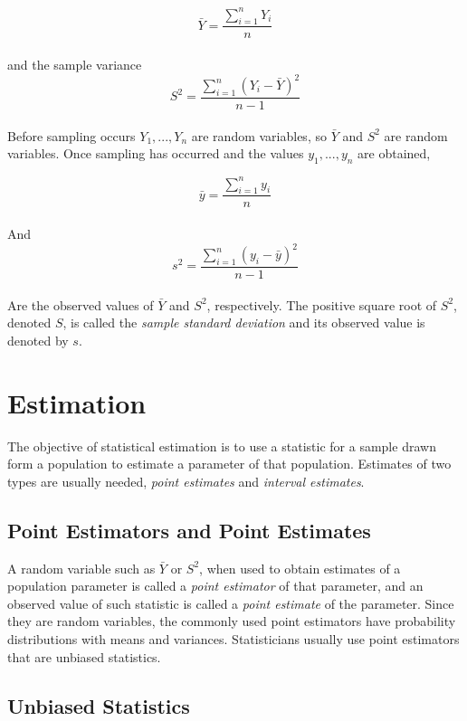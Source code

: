\documentclass{WileySev}
\begin{document}
\begin{equation}
\bar{Y}=\frac{\sum_{i=1}^nY_i}{n}
\end{equation}
\\
and the sample variance
\begin{equation}
S^2=\frac{\sum_{i=1}^n(Y_i-\bar{Y})^2}{n-1}
\end{equation}
\\
Before sampling occurs $Y_1,...,Y_n$ are random variables, so $\bar{Y}$ and $S^2$ are random variables. Once sampling has occurred and the values $y_1,...,y_n$ are obtained,

\begin{equation}
\bar{y}=\frac{\sum_{i=1}^ny_i}{n}
\end{equation}
\\
And
\begin{equation}
s^2=\frac{\sum_{i=1}^n(y_i-\bar{y})^2}{n-1}
\end{equation}
\\
Are the observed values of $\bar{Y}$ and $S^2$, respectively. The positive square root of $S^2$, denoted $S$, is called the \textit{sample standard deviation} and its observed value is denoted by $s$.

\section{Estimation}

The objective of statistical estimation is to use a statistic for a sample drawn form a population to estimate a parameter of that population. Estimates of two types are usually needed, \textit{point estimates} and \textit{interval estimates}.

\subsection{Point Estimators and Point Estimates}

A random variable such as $\bar{Y}$ or $S^2$, when used to obtain estimates of a population parameter is called a \textit{point estimator} of that parameter, and an observed value of such statistic is called a \textit{point estimate} of the parameter. Since they are random variables, the commonly used point estimators have probability distributions with means and variances. Statisticians usually use point estimators that are unbiased statistics.

\subsection{Unbiased Statistics}
\end{document}
